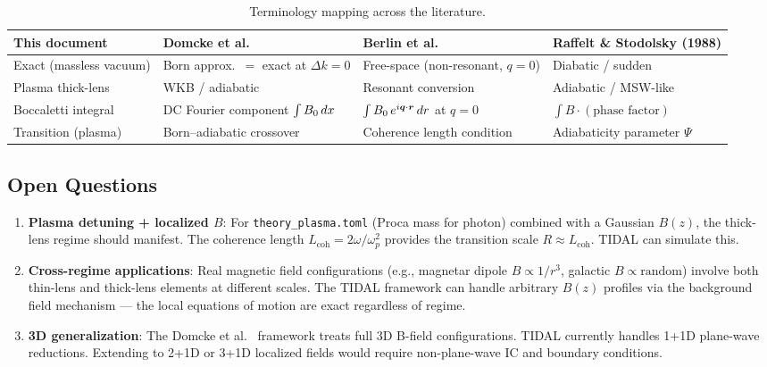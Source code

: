 \begin{table}[htbp]
\centering
\caption{Terminology mapping across the literature.}
\label{tab:terminology}
\begin{tabular}{@{}llll@{}}
\toprule
This document & Domcke et al.~\cite{domcke2025scattering} & Berlin et al.~\cite{berlin2024axionphoton} & Raffelt \& Stodolsky (1988) \\
\midrule
Exact (massless vacuum) & Born approx.\ $=$ exact at $\Delta k=0$ & Free-space (non-resonant, $q=0$) & Diabatic / sudden \\
Plasma thick-lens & WKB / adiabatic & Resonant conversion & Adiabatic / MSW-like \\
Boccaletti integral & DC Fourier component $\int B_0\, dx$ & $\int B_0\, e^{i\bm{q}\cdot\bm{r}}\, dr$ at $q=0$ & $\int B \cdot (\text{phase factor})$ \\
Transition (plasma) & Born--adiabatic crossover & Coherence length condition & Adiabaticity parameter $\Psi$ \\
\bottomrule
\end{tabular}
\end{table}


\subsection{Open Questions}
\label{sec:localized-open}

\begin{enumerate}
  \item \textbf{Plasma detuning + localized $B$}: For \texttt{theory\_plasma.toml} (Proca mass for photon) combined
    with a Gaussian $B(z)$, the thick-lens regime should manifest. The coherence length
    $L_\text{coh} = 2\omega/\omega_p^2$ provides the transition scale $R \approx L_\text{coh}$. TIDAL can simulate this.

  \item \textbf{Cross-regime applications}: Real magnetic field configurations (e.g., magnetar dipole
    $B \propto 1/r^3$, galactic $B \propto \text{random}$) involve both thin-lens and thick-lens elements at different
    scales. The TIDAL framework can handle arbitrary $B(z)$ profiles via the background field
    mechanism --- the local equations of motion are exact regardless of regime.

  \item \textbf{3D generalization}: The Domcke et al.~\cite{domcke2025scattering} framework treats full 3D B-field
    configurations. TIDAL currently handles 1+1D plane-wave reductions. Extending to 2+1D
    or 3+1D localized fields would require non-plane-wave IC and boundary conditions.
\end{enumerate}
